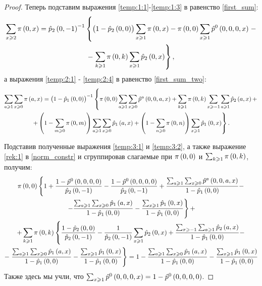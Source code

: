 \documentclass[a4paper,14pt,russian]{article}
\newcommand{\p}{\hat{p}}
\begin{document}
\begin{proof}
Теперь подставим выражения \eqref{temp:1:1}-\eqref{temp:1:3} в равенство \eqref{first_sum}:
\begin{multline}
  \sum_{x \geqslant 2} \pi\br{0,x} = \p_2\br{0,-1}^{-1} \left\{\br{1 - \p_2\br{0,0}} \sum_{x \geqslant 1} \pi\br{0,x} -
\pi \br{0,0}\sum_{x \geqslant 1}\p^0\br{0,0,0,x}  \right.-\\- \left. \sum_{k \geqslant 1} \pi\br{0,k} \sum_{x \geqslant 1} \p_2\br{0,x}  
\right\},
\label{temp:3:1}
\end{multline}
а выражения \eqref{temp:2:1} - \eqref{temp:2:4} в равенство \eqref{first_sum_two}:
\begin{multline}
 \sum_{a \geqslant 1} \sum_{x\geqslant 0} \pi\br{a,x} =\br{1-\p_1\br{0,0}}^{-1} \left\{
 \pi\br{0,0} \sum_{a \geqslant 1}  \sum_{x\geqslant 0} \p^a\br{0,0,a,x} + 
\sum_{k\geqslant 1} \pi\br{0,k} \sum_{x\geqslant -1}\sum_{a \geqslant 1} \p_2\br{a,x} + \right.\\ \left.+
\br{1 - \sum_{m\geqslant 0}\pi\br{0,m}} \sum_{a \geqslant 1} \sum_{x\geqslant 0} \p_1\br{a,x} + 
\br{1 - \sum_{n\geqslant 0}\pi\br{0,n}}\sum_{x\geqslant 1} \p_1\br{0,x} \right\}.
\label{temp:3:2}
\end{multline}

Подставив полученные выражения \eqref{temp:3:1} и \eqref{temp:3:2}, а также выражение \eqref{rek:1} в \eqref{norm_constr}
и сгруппировав слагаемые при $\pi\left(0,0\right)$ и $\sum_{k \geqslant 1} \pi\left(0,k\right)$, получим:
\begin{multline*}
 \pi\br{0,0}\left\{1 + \frac{1- \p^0\br{0,0,0,0}}{\p_2\br{0,-1}} - 
 \frac{1- \p^0\br{0,0,0,0}}{\p_2\br{0,-1}} + \frac{\sum_{a\geqslant 1}\sum_{x\geqslant 0}\p^a\br{0,0,a,x}}{1 - \p_1\br{0,0}} 
 -\right. \\ \left. -\frac{\sum_{a\geqslant 1}\sum_{x\geqslant 0} \p_1\br{a,x}}{1 - \p_1\br{0,0}}  - \frac{\sum_{x \geqslant 1} \p_1\br{0,x}}{1 - \p_1\br{0,0}}
\right\} + \\ +
\sum_{k \geqslant 1} \pi\br{0,k}\left\{\frac{1-\p_2\br{0,0}}{\p_2\br{0,-1}} - \frac{1}{\p_2\br{0,-1}} \sum_{x\geqslant 1}\p_2 \br{0,x} +
\frac{\sum_{x\geqslant -1}\sum_{a\geqslant 1}\p_2\br{a,x}}{1 - \p_1\br{0,0}} - \right. \\ -\left.  \frac{\sum_{a\geqslant 1}\sum_{x\geqslant 0}\p_1\br{a,x}}{1 - \p_1\br{0,0}} -
\frac{\sum_{x\geqslant 1}\p_1\br{0,x}}{1 - \p_1\br{0,0}} \right\} = 1  - \frac{\sum_{a\geqslant 1}\sum_{x\geqslant 0}\p_1\br{a,x}}{1 - \p_1\br{0,0}} -
\frac{\sum_{x\geqslant 1}\p_1\br{0,x}}{1 - \p_1\br{0,0}} 
\end{multline*}
Также здесь мы учли, что $\sum_{x \geqslant 1} \p^0\br{0,0,0,x} = 1 - \p^0\br{0,0,0,0}$.


\end{proof}
\end{document}
